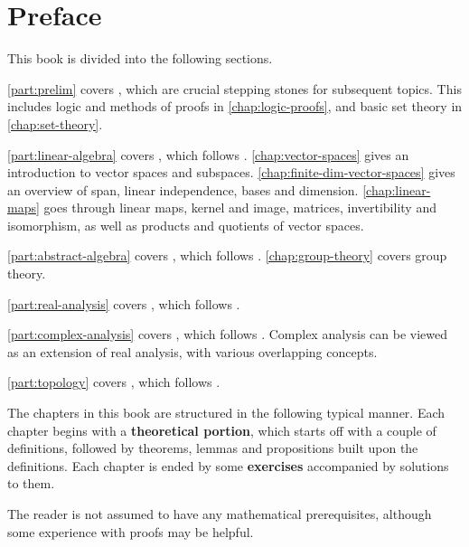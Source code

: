 \section*{Preface}
This book is divided into the following sections.

\cref{part:prelim} covers , which are crucial stepping stones for subsequent topics. This includes logic and methods of proofs in \cref{chap:logic-proofs}, and basic set theory in \cref{chap:set-theory}.

\cref{part:linear-algebra} covers , which follows \cite{axler}. \cref{chap:vector-spaces} gives an introduction to vector spaces and subspaces. \cref{chap:finite-dim-vector-spaces} gives an overview of span, linear independence, bases and dimension. \cref{chap:linear-maps} goes through linear maps, kernel and image, matrices, invertibility and isomorphism, as well as products and quotients of vector spaces.

\cref{part:abstract-algebra} covers , which follows \cite{dummit-foote}. \cref{chap:group-theory} covers group theory.

\cref{part:real-analysis} covers , which follows \cite{rudin,apostol}. 

\cref{part:complex-analysis} covers , which follows \cite{ahlfors,lang}. Complex analysis can be viewed as an extension of real analysis, with various overlapping concepts.

\cref{part:topology} covers , which follows \cite{munkres}.


The chapters in this book are structured in the following typical manner. Each chapter begins with a \textbf{theoretical portion}, which starts off with a couple of definitions, followed by theorems, lemmas and propositions built upon the definitions. Each chapter is ended by some \textbf{exercises} accompanied by solutions to them.

The reader is not assumed to have any mathematical prerequisites, although some experience with proofs may be helpful.

